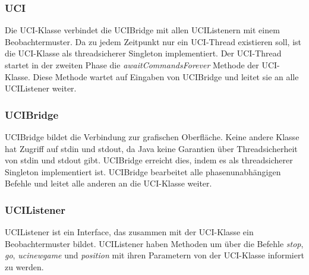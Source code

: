 \subsubsection{UCI}\label{subsubsec:uci}
Die UCI-Klasse verbindet die UCIBridge mit allen UCIListenern mit einem Beobachtermuster.
Da zu jedem Zeitpunkt nur ein UCI-Thread existieren soll, ist die UCI-Klasse als threadsicherer Singleton implementiert.
Der UCI-Thread startet in der zweiten Phase die \textit{awaitCommandsForever} Methode der UCI-Klasse.
Diese Methode wartet auf Eingaben von UCIBridge und leitet sie an alle UCIListener weiter.

\subsubsection{UCIBridge}\label{subsubsec:ucibridge}
UCIBridge bildet die Verbindung zur grafischen Oberfl\"ache.
Keine andere Klasse hat Zugriff auf stdin und stdout, da Java keine Garantien \"uber Threadsicherheit von stdin und stdout gibt.
UCIBridge erreicht dies, indem es als threadsicherer Singleton implementiert ist.
UCIBridge bearbeitet alle phasenunabh\"angigen Befehle und leitet alle anderen an die UCI-Klasse weiter.

\subsubsection{UCIListener}\label{subsubsec:ucilistener}
UCIListener ist ein Interface, das zusammen mit der UCI-Klasse ein Beobachtermuster bildet.
UCIListener haben Methoden um \"uber die Befehle \textit{stop}, \textit{go}, \textit{ucinewgame} und \textit{position}
mit ihren Parametern von der UCI-Klasse informiert zu werden.


